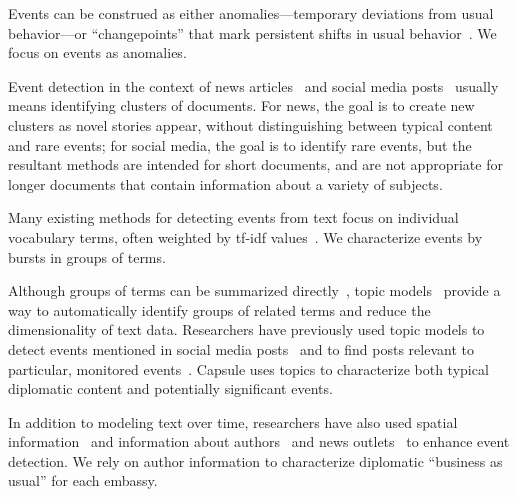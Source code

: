 Events can be construed as either anomalies---temporary deviations
from usual behavior---or ``changepoints'' that mark persistent shifts
in usual behavior~\cite{guralnik1999event,adams2007bayesian}. We focus
on events as anomalies.


Event detection in the context of news
articles~\cite{zhao2012novel,zhao2007temporal,zhang2002novelty,li2005probabilistic,wang2007mining,allan1998line}
and social media
posts~\cite{VanDam:2012,lau2012line,jackoway2011identification,sakaki2010earthquake,reuter2012event,becker2010learning,sayyadi2009event}
usually means identifying clusters of documents. For news, the goal is
to create new clusters as novel stories appear, without distinguishing
between typical content and rare events; for social media, the goal is
to identify rare events, but the resultant methods are intended for
short documents, and are not appropriate for longer documents that
contain information about a variety of subjects.

Many existing methods for detecting events from text focus on
individual vocabulary terms, often weighted by tf-idf
values~\cite{fung2005parameter,kumaran2004text,brants2003system,das2011dynamic,zhao2007temporal,zhao2012novel}.
We characterize events by bursts in groups of terms.

Although groups of terms can be summarized
directly~\cite{peng2007event,chakrabarti2011event,gao2012joint}, topic
models~\cite{Blei:2012} provide a way to automatically identify groups
of related terms and reduce the dimensionality of text
data. Researchers have previously used topic models to detect events
mentioned in social media posts~\cite{lau2012line,dou2012leadline} and
to find posts relevant to particular, monitored
events~\cite{VanDam:2012}. Capsule uses topics to characterize both
typical diplomatic content and potentially significant events.

In addition to modeling text over time, researchers have also used
spatial
information~\cite{Neill:2005,mathioudakis2010identifying,liu2011using}
and information about authors~\cite{zhao2007temporal} and news
outlets~\cite{wang2007mining} to enhance event detection. We rely on
author information to characterize diplomatic ``business as usual''
for each embassy.

